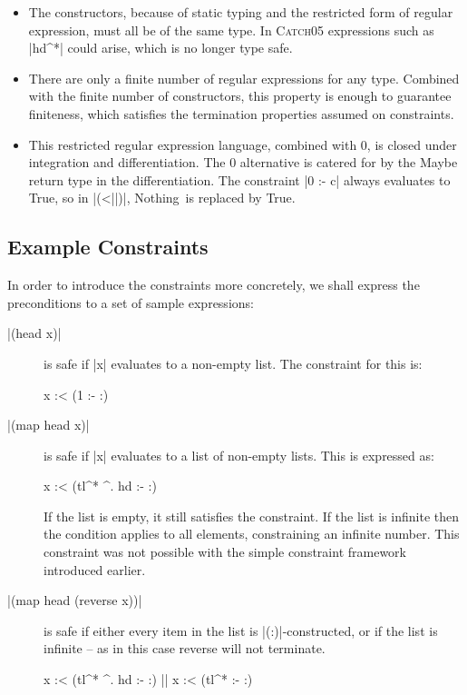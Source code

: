 \documentclass[preprint]{sigplanconf}
\newcommand{\C}[1]{\textsf{#1}}
\newcommand{\catch}{\textsc{Catch}}
\begin{document}
\begin{itemize}
\item The constructors, because of static typing and the restricted form of regular expression, must all be of the same type. In \catch05 expressions such as |hd^*| could arise, which is no longer type safe.

\item There are only a finite number of regular expressions for any type. Combined with the finite number of constructors, this property is enough to guarantee finiteness, which satisfies the termination properties assumed on constraints.

\item This restricted regular expression language, combined with 0, is closed under integration and differentiation. The 0 alternative is catered for by the \C{Maybe} return type in the differentiation. The constraint |0 :- c| always evaluates to True, so in |(<||)|, \C{Nothing}\ is replaced by True.
\end{itemize}

\subsection{Example Constraints}
\label{sec:small_examples}

In order to introduce the constraints more concretely, we shall express the preconditions to a set of sample expressions:

\begin{description}
\item[|(head x)|] is safe if |x| evaluates to a non-empty list. The constraint for this is:

    \begin{code}
    x :< (1 :- {:})
    \end{code}

\item[|(map head x)|] is safe if |x| evaluates to a list of non-empty lists. This is expressed as:

    \begin{code}
    x :< (tl^* ^. hd :- {:})
    \end{code}

    If the list is empty, it still satisfies the constraint. If the list is infinite then the condition applies to all elements, constraining an infinite number. This constraint was not possible with the simple constraint framework introduced earlier.

\item[|(map head (reverse x))|] is safe if either every item in the list is |(:)|-constructed, or if the list is infinite -- as in this case \C{reverse} will not terminate.

    \begin{code}
    x :< (tl^* ^. hd :- {:}) || x :< (tl^* :- {:})
    \end{code}
\end{description}
\end{document}
